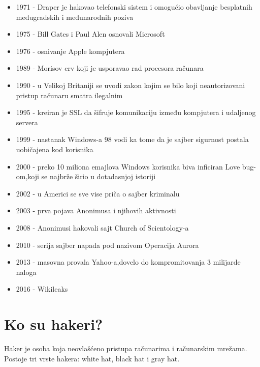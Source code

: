 \documentclass[a4paper]{article}
\begin{document}
\begin{itemize}
\item 1971 - Draper je hakovao telefonski sistem i omogućio obavljanje besplatnih međugradskih i međunarodnih poziva
\item 1975 - Bill Gates i Paul Alen osnovali Microsoft
\item 1976 - osnivanje Apple kompjutera
\item 1989 - Morisov crv koji je usporavao rad procesora računara
\item 1990 - u Velikoj Britaniji se uvodi zakon kojim se bilo koji neautorizovani pristup računaru smatra ilegalnim
\item 1995 - kreiran je SSL da šifruje komunikaciju između kompjutera i udaljenog servera
\item 1999 - nastanak Windows-a 98 vodi ka tome da je sajber sigurnost postala uobičajena kod korisnika
\item 2000 - preko 10 miliona emajlova Windows korisnika biva inficiran Love bug-om,koji se najbrže širio u dotadasnjoj istoriji
\item 2002 - u Americi se sve vise priča o sajber kriminalu
\item 2003 - prva pojava Anonimusa i njihovih aktivnosti
\item 2008 - Anonimusi hakovali sajt Church of Scientology-a
\item 2010 - serija sajber napada pod nazivom Operacija Aurora 
\item 2013 - masovna provala Yahoo-a,dovelo do kompromitovanja 3 milijarde naloga
\item 2016 - Wikileaks

\end{itemize} 

\newpage


\section{Ko su hakeri?}	
\label{sec:naslov1}
Haker je osoba koja neovlašćeno pristupa računarima i računarskim mrežama.
\newline
Postoje tri vrste hakera: white hat, black hat i gray hat.
\end{document}
